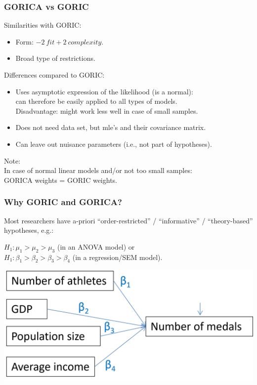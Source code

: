 \documentclass[10pt]{beamer}\usepackage[]{graphicx}\usepackage[]{xcolor}
\begin{document}
\begin{frame}
	\frametitle{GORICA vs GORIC}
	
	Similarities with GORIC:
		\begin{itemize}
			\item Form: $-2 \ fit + 2 \ complexity$.
			\item Broad type of restrictions.
		\end{itemize}
		
		\vspace{.5 cm}
	
	Differences compared to GORIC:
		\begin{itemize}
			\item Uses asymptotic expression of the likelihood (is a normal): \\
			can therefore be easily applied to all types of models. \\
			Disadvantage: might work less well in case of small samples.
			\item Does not need data set, but
			mle's and their covariance matrix.
			\item Can leave out nuisance parameters (i.e., not part of hypotheses).
		\end{itemize}
	
	\vspace{.5 cm}
	
	Note:\\
		In case of normal linear models and/or not too small samples: \\
		GORICA weights = GORIC weights.
\end{frame}
%
\begin{frame}
	\frametitle{Why GORIC and GORICA?}

Most researchers have a-priori ``order-restricted'' / ``informative'' / ``theory-based'' hypotheses, e.g.:

\vspace{.5 cm}

$H_{1}:  \mu_1 > \mu_2 > \mu_3$ (in an ANOVA model) or \\
$H_{1}:  \beta_1 > \beta_2 > \beta_3 > \beta_4$ (in a regression/SEM model). 

\vspace{2\baselineskip}
\includegraphics[width = 0.6\linewidth]{Model-Unc.png}

\end{frame}
\end{document}
